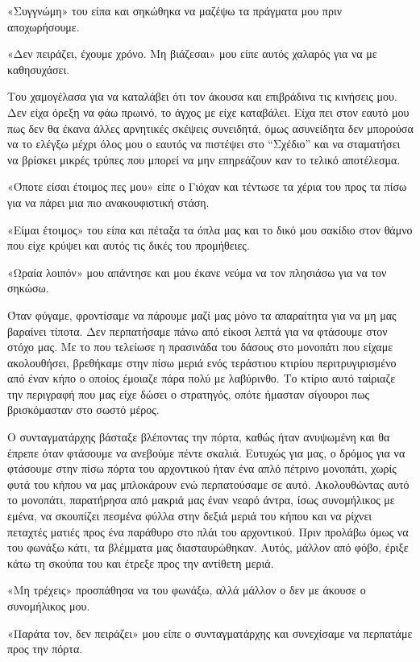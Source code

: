 \documentclass[12pt,twoside, openany]{book}
\begin{document}
«Συγγνώμη» του είπα και σηκώθηκα να μαζέψω τα πράγματα μου πριν αποχωρήσουμε.

«Δεν πειράζει, έχουμε χρόνο. Μη βιάζεσαι» μου είπε αυτός χαλαρός για να με καθησυχάσει.

Του χαμογέλασα για να καταλάβει ότι τον άκουσα και επιβράδινα τις κινήσεις μου. Δεν είχα όρεξη να φάω πρωινό, το άγχος με είχε καταβάλει. Είχα πει στον εαυτό μου πως δεν θα έκανα άλλες αρνητικές σκέψεις συνειδητά, όμως ασυνείδητα δεν μπορούσα να το ελέγξω μέχρι όλος μου ο εαυτός να πιστέψει στο “Σχέδιο” και να σταματήσει να βρίσκει μικρές τρύπες που μπορεί να μην επηρεάζουν καν το τελικό αποτέλεσμα.

«Όποτε είσαι έτοιμος πες μου» είπε ο Γιόχαν και τέντωσε τα χέρια του προς τα πίσω για να πάρει μια πιο ανακουφιστική στάση.

«Είμαι έτοιμος» του είπα και πέταξα τα όπλα μας και το δικό μου σακίδιο στον θάμνο που είχε κρύψει και αυτός τις δικές του προμήθειες.

«Ωραία λοιπόν» μου απάντησε και μου έκανε νεύμα να τον πλησιάσω για να τον σηκώσω. 

Όταν φύγαμε, φροντίσαμε να πάρουμε μαζί μας μόνο τα απαραίτητα για να μη μας βαραίνει τίποτα. Δεν περπατήσαμε πάνω από είκοσι λεπτά για να φτάσουμε στον στόχο μας. Με το που τελείωσε η πρασινάδα του δάσους στο μονοπάτι που είχαμε ακολουθήσει, βρεθήκαμε στην πίσω μεριά ενός τεράστιου κτιρίου περιτρυγιρισμένο από έναν κήπο ο οποίος έμοιαζε πάρα πολύ με λαβύρινθο. Το κτίριο αυτό ταίριαζε την περιγραφή που μας είχε δώσει ο στρατηγός, οπότε ήμασταν σίγουροι πως βρισκόμασταν στο σωστό μέρος.

Ο συνταγματάρχης βάσταξε βλέποντας την πόρτα, καθώς ήταν ανυψωμένη και θα έπρεπε όταν φτάσουμε να ανεβούμε πέντε σκαλιά. Ευτυχώς για μας, ο δρόμος για να φτάσουμε στην πίσω πόρτα του αρχοντικού ήταν ένα απλό πέτρινο μονοπάτι, χωρίς φυτά του κήπου να μας μπλοκάρουν ενώ περπατούσαμε σε αυτό. Ακολουθώντας αυτό το μονοπάτι, παρατήρησα από μακριά μας έναν νεαρό άντρα, ίσως συνομήλικος με εμένα, να σκουπίζει πεσμένα φύλλα στην δεξιά μεριά του κήπου και να ρίχνει πεταχτές ματιές προς ένα παράθυρο στο πλάι του αρχοντικού. Πριν προλάβω όμως να του φωνάξω κάτι, τα βλέμματα μας διασταυρώθηκαν. Αυτός, μάλλον από φόβο, έριξε κάτω τη σκούπα του και έτρεξε προς την αντίθετη μεριά.

«Μη τρέχεις» προσπάθησα να του φωνάξω, αλλά μάλλον ο δεν με άκουσε ο συνομήλικος μου.

«Παράτα τον, δεν πειράζει» μου είπε ο συνταγματάρχης και συνεχίσαμε να περπατάμε προς την πόρτα.
\end{document}
